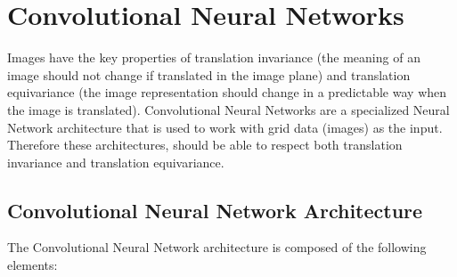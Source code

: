 \chapter{Convolutional Neural Networks}

Images have the key properties of translation invariance (the meaning of an image should not change if translated in the image plane) and translation equivariance (the image representation should change in a predictable way when the image is translated). Convolutional Neural Networks are a specialized Neural Network architecture that is used to work with grid data (images) as the input. Therefore these architectures, should be able to respect both translation invariance and translation equivariance.

\section{Convolutional Neural Network Architecture}

The Convolutional Neural Network architecture is composed of the following elements:

